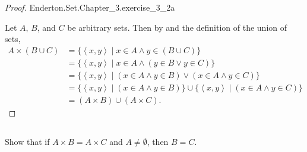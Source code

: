 \documentclass{report}
\begin{document}
\begin{proof}

    {Enderton.Set.Chapter\_3.exercise\_3\_2a}

  Let $A$, $B$, and $C$ be arbitrary sets.
  Then by  and the definition of the union of sets,
    \begin{align*}
      A \times (B \cup C)
        & = \{ \left< x, y \right> \mid x \in A \land y \in (B \cup C) \} \\
        & = \{ \left< x, y \right> \mid
          x \in A \land (y \in B \lor y \in C) \} \\
        & = \{ \left< x, y \right> \mid
          (x \in A \land y \in B) \lor (x \in A \land y \in C) \} \\
        & = \{ \left< x, y \right> \mid (x \in A \land y \in B) \} \cup
          \{ \left< x, y \right> \mid (x \in A \land y \in C) \} \\
        & = (A \times B) \cup (A \times C).
    \end{align*}

\end{proof}

\subsection{}%
\label{sub:exercise-3.2b}

Show that if $A \times B = A \times C$ and $A \neq \emptyset$, then $B = C$.
\end{document}
